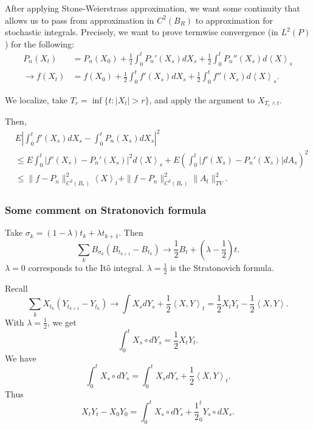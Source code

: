 
After applying Stone-Weierstrass approximation, we want some continuity that allows us to pass from approximation in $C^2(B_R)$ to approximation for stochastic integrals. Precisely, we want to
prove termwise convergence (in $L^2(P)$) for the following:
\begin{align*}
	 P_n(X_t) &= P_n(X_0) + \frac{1}{2} \int _0^t P_n'(X_s) dX_s + \frac{1}{2} \int _0^t P_n'' (X_s) d \left\langle X \right\rangle _s\\
	\to 
	f(X_t) &= f(X_0) + \frac{1}{2}\int _0^t	f'(X_s) d X_s + \frac{1}{2} \int _0^t f''(X_s) d\left\langle X \right\rangle _s
.\end{align*}

We localize, take $T_r = \inf \{t: \left| X_t \right| > r\} $, and apply the argument to $X_{T_r \wedge t}$. 

Then, 
\begin{align*}
	&E\left| \int _0^t f'(X_s) d X_s - \int _0^t P_n(X_s) d X_s \right| ^2\\
	&\le  E \int _0^t \left| f'(X_s) - P_n'(X_s) \right| ^2 d \left\langle X \right\rangle _s
	+ E \left(\int _0^t \left| f'(X_s) - P_n'(X_s) \right| d A_s\right)^2\\
	&\le \|f - P_n\|_{C^2(B_r)}^2 \left\langle X \right\rangle _t + \|f - P_n\|_{C^2(B_r)}^2 \|A_t\|_{TV}^2
.\end{align*} 

\subsubsection{Some comment on Stratonovich formula}

Take $\sigma_k = (1 - \lambda) t_k + \lambda t_{k+1}$. Then
\[
	\sum_k B_{\sigma_k}\left( B_{t_{k+1}} - B_{t_k} \right) 
	\to  \frac{1}{2} B_t + \left( \lambda - \frac{1}{2} \right) t
.\] 
$\lambda = 0$ corresponds to the Itô integral. $\lambda = \frac{1}{2}$ is the Stratonovich formula.

Recall
\[
	\sum_k X_{t_k} \left( Y_{t_{k+1}} - Y_{t_k} \right) 
	\to  \int X_s d Y_s + \frac{1}{2} \left\langle X, Y \right\rangle _t
	= \frac{1}{2} X_t Y_t - \frac{1}{2} \left\langle X, Y \right\rangle 
.\] 
With $\lambda = \frac{1}{2}$, we get
\[
	\int _0^t X_s \circ d Y_s = \frac{1}{2} X_t Y_t
.\] 
We have
\[
	\int _0^t X_s \circ d Y_s 
	= \int _0^t X_s d Y_s + \frac{1}{2} \left\langle X, Y \right\rangle _t
.\] 
Thus
\[
	X_t Y_t - X_0 Y_0 = \int _0^t X_s \circ d Y_s + \frac{1}{2}_0^t Y_s \circ d X_s
.\] 

